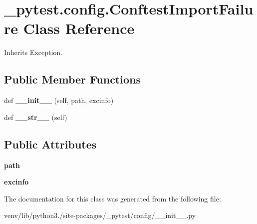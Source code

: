 \hypertarget{class__pytest_1_1config_1_1_conftest_import_failure}{}\section{\+\_\+pytest.\+config.\+Conftest\+Import\+Failure Class Reference}
\label{class__pytest_1_1config_1_1_conftest_import_failure}


Inherits Exception.

\subsection*{Public Member Functions}
\begin{DoxyCompactItemize}
\item 
\mbox{\label{class__pytest_1_1config_1_1_conftest_import_failure_af29e02b90cb04b21305cdf221e83df75}} 
def {\bfseries \+\_\+\+\_\+init\+\_\+\+\_\+} (self, path, excinfo)
\item 
\mbox{\label{class__pytest_1_1config_1_1_conftest_import_failure_a2b335d731c5a395f62853ea7ff316956}} 
def {\bfseries \+\_\+\+\_\+str\+\_\+\+\_\+} (self)
\end{DoxyCompactItemize}
\subsection*{Public Attributes}
\begin{DoxyCompactItemize}
\item 
\mbox{\label{class__pytest_1_1config_1_1_conftest_import_failure_a2853a4a8dfafd3c861230744d47da712}} 
{\bfseries path}
\item 
\mbox{\label{class__pytest_1_1config_1_1_conftest_import_failure_af5ac5ed5855e74029dc0c5905f70532e}} 
{\bfseries excinfo}
\end{DoxyCompactItemize}


The documentation for this class was generated from the following file\+:\begin{DoxyCompactItemize}
\item 
venv/lib/python3./site-\/packages/\+\_\+pytest/config/\+\_\+\+\_\+init\+\_\+\+\_\+.\+py\end{DoxyCompactItemize}
